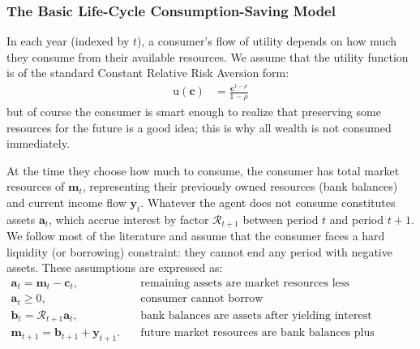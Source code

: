 \documentclass{article}
\newcommand{\CRRA}{\rho}
\newcommand{\uFunc}{\mathrm{u}}
\newcommand{\cLvl}{\mathbf{c}}
\newcommand{\mLvl}{\mathbf{m}}
\newcommand{\yLvl}{\mathbf{y}}
\newcommand{\aLvl}{\mathbf{a}}
\newcommand{\Rport}{\mathcal{R}}
\newcommand{\bLvl}{\mathbf{b}}
\begin{document}
\subsubsection{The Basic Life-Cycle Consumption-Saving Model}\label{basic-cs}

In each year (indexed by $t$), a consumer's flow of utility depends on how much they consume from their available resources.
We assume that the utility function is of the standard Constant Relative Risk Aversion form:
\begin{align}
    \uFunc(\cLvl) & = \frac{\cLvl^{1-\CRRA}}{1-\CRRA}
\end{align}
but of course the consumer is smart enough to realize that preserving some resources for the future is a good idea; this is why all wealth is not consumed immediately.

At the time they choose how much to consume, the consumer has total market resources of $\mLvl_t$, representing their previously owned resources (bank balances) and current income flow $\yLvl_t$.
Whatever the agent does not consume constitutes assets $\aLvl_t$, which accrue interest by factor $\Rport_{t+1}$ between period $t$ and period $t+1$.
We follow most of the literature and assume that the consumer faces a hard liquidity (or borrowing) constraint: they cannot end any period with negative assets.
These assumptions are expressed as:
\begin{align}
    \aLvl_t = \mLvl_t - \cLvl_t, & \text{~~~remaining assets are market resources less consumption} \\
    \aLvl_t \geq 0, & \text{~~~consumer cannot borrow} \\
    \bLvl_t = \Rport_{t+1} \aLvl_t, & \text{~~~bank balances are assets after yielding interest} \\
    \mLvl_{t+1} = \bLvl_{t+1} + \yLvl_{t+1}. & \text{~~~future market resources are bank balances plus income} \\
\end{align}
\end{document}
